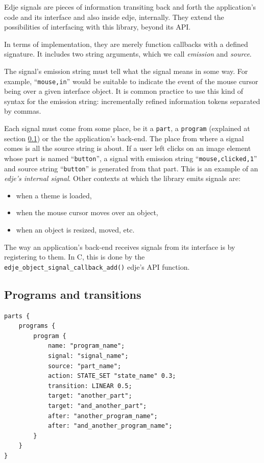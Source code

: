 \documentclass[a4paper]{profusion}
\begin{document}
Edje signals are pieces of information transiting back and forth the
application's code and its interface and also inside edje,
internally. They extend the possibilities of interfacing with this
library, beyond its API.

In terms of implementation, they are merely function callbacks with a
defined signature. It includes two string arguments, which we call
\emph{emission} and \emph{source}.

The signal's emission string must tell what the signal means in some
way. For example, ``\texttt{mouse,in}'' would be suitable to indicate
the event of the mouse cursor being over a given interface object. It
is common practice to use this kind of syntax for the emission string:
incrementally refined information tokens separated by commas.

Each signal must come from some place, be it a \texttt{part}, a
\texttt{program} (explained at section \ref{sec:progs}) or the the
application's back-end. The place from where a signal comes is all the
source string is about. If a user left clicks on an image element
whose part is named ``\texttt{button}'', a signal with emission string
``\texttt{mouse,clicked,1}'' and source string ``\texttt{button}'' is
generated from that part. This is an example of an \emph{edje's
  internal signal}. Other contexts at which the library emits signals
are:
\begin{itemize}
\item when a theme is loaded,
\item when the mouse cursor moves over an object,
\item when an object is resized, moved, etc.
\end{itemize}

The way an application's back-end receives signals from its interface
is by registering to them. In C, this is done by the
\texttt{edje\_object\_signal\_callback\_add()} edje's API function.

\subsection{Programs and transitions}
\label{sec:progs}

\begin{lstlisting}
parts {
    programs {
        program {
            name: "program_name";
            signal: "signal_name";
            source: "part_name";
            action: STATE_SET "state_name" 0.3;
            transition: LINEAR 0.5;
            target: "another_part";
            target: "and_another_part";
            after: "another_program_name";
            after: "and_another_program_name";
        }
    }
}
\end{lstlisting}
\end{document}
